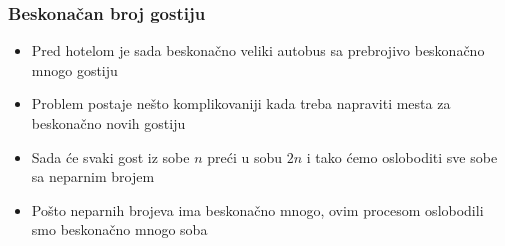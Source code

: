 \documentclass{beamer}
\begin{document}
\begin{frame}[fragile]\frametitle{Beskonačan broj gostiju}
\begin{itemize}
    \item Pred hotelom je sada beskonačno veliki autobus sa prebrojivo beskonačno mnogo gostiju
    \item Problem postaje nešto komplikovaniji kada treba napraviti mesta za beskonačno novih gostiju
    \item Sada će svaki gost iz sobe $n$ preći u sobu $2n$ i tako ćemo osloboditi sve sobe sa neparnim brojem
    \item Pošto neparnih brojeva ima beskonačno mnogo, ovim procesom oslobodili smo beskonačno mnogo soba
\end{itemize}
\end{frame}
\end{document}
